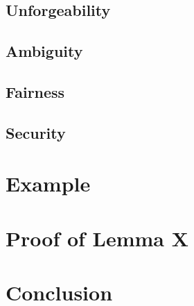\documentclass{beamer}
\begin{document}
\subsection{Unforgeability}
% 

\subsection{Ambiguity}
% 

\subsection{Fairness}
% 

\subsection{Security}
% 

\section{Example}


\section{Proof of Lemma X}


\section{Conclusion}

\end{document}
